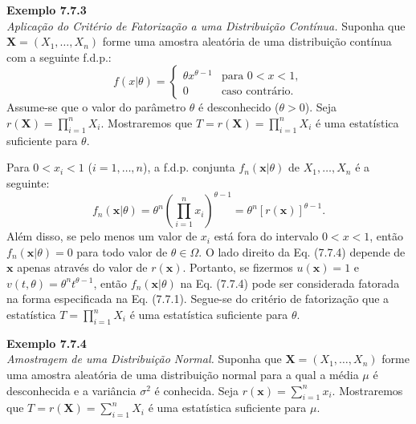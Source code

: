 \noindent\textbf{Exemplo 7.7.3} \\
\textit{Aplicação do Critério de Fatorização a uma Distribuição Contínua.} Suponha que $\mathbf{X}=(X_1, \dots, X_n)$ forme uma amostra aleatória de uma distribuição contínua com a seguinte f.d.p.:
\[
f(x|\theta) =
\begin{cases}
    \theta x^{\theta-1} & \text{para } 0 < x < 1, \\
    0 & \text{caso contrário.}
\end{cases}
\]
Assume-se que o valor do parâmetro $\theta$ é desconhecido ($\theta > 0$). Seja $r(\mathbf{X}) = \prod_{i=1}^{n} X_i$. Mostraremos que $T=r(\mathbf{X}) = \prod_{i=1}^{n} X_i$ é uma estatística suficiente para $\theta$.

Para $0 < x_i < 1$ ($i=1, \dots, n$), a f.d.p. conjunta $f_n(\mathbf{x}|\theta)$ de $X_1, \dots, X_n$ é a seguinte:
\begin{equation}
f_n(\mathbf{x}|\theta) = \theta^n \left( \prod_{i=1}^{n} x_i \right)^{\theta-1} = \theta^n [r(\mathbf{x})]^{\theta-1}. \tag{7.7.4}
\end{equation}
Além disso, se pelo menos um valor de $x_i$ está fora do intervalo $0 < x < 1$, então $f_n(\mathbf{x}|\theta)=0$ para todo valor de $\theta \in \Omega$. O lado direito da Eq. (7.7.4) depende de $\mathbf{x}$ apenas através do valor de $r(\mathbf{x})$. Portanto, se fizermos $u(\mathbf{x})=1$ e $v(t, \theta)=\theta^n t^{\theta-1}$, então $f_n(\mathbf{x}|\theta)$ na Eq. (7.7.4) pode ser considerada fatorada na forma especificada na Eq. (7.7.1). Segue-se do critério de fatorização que a estatística $T = \prod_{i=1}^{n} X_i$ é uma estatística suficiente para $\theta$.

\vspace{\baselineskip}

\noindent\textbf{Exemplo 7.7.4} \\
\textit{Amostragem de uma Distribuição Normal.} Suponha que $\mathbf{X}=(X_1, \dots, X_n)$ forme uma amostra aleatória de uma distribuição normal para a qual a média $\mu$ é desconhecida e a variância $\sigma^2$ é conhecida. Seja $r(\mathbf{x})=\sum_{i=1}^{n} x_i$. Mostraremos que $T=r(\mathbf{X}) = \sum_{i=1}^{n} X_i$ é uma estatística suficiente para $\mu$.

\vspace{\baselineskip}

